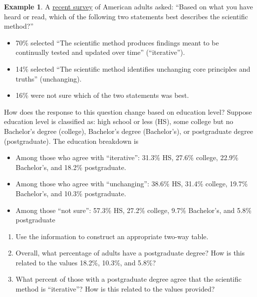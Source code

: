 \documentclass[
]{book}
\providecommand{\tightlist}{%
  \setlength{\itemsep}{0pt}\setlength{\parskip}{0pt}}
\theoremstyle{definition}
\theoremstyle{definition}
\newtheorem{example}{Example}[chapter]
\theoremstyle{definition}
\theoremstyle{remark}
\begin{document}
\begin{example}
\protect\hypertarget{exm:bayes-rule1}{}{\label{exm:bayes-rule1} }
A \href{https://www.pewresearch.org/science/2019/03/28/what-americans-know-about-science/}{recent survey} of American adults asked:
``Based on what you have heard or read, which of the following two statements best describes
the scientific method?''

\begin{itemize}
\tightlist
\item
  70\% selected ``The scientific method produces findings meant to be continually tested
  and updated over time'' (``iterative'').
\item
  14\% selected ``The scientific method identifies unchanging core principles and truths'' (unchanging).
\item
  16\% were not sure which of the two statements was best.
\end{itemize}

How does the response to this question change based on education level? Suppose education level is classified as: high school or less (HS), some college but no Bachelor's degree (college), Bachelor's degree (Bachelor's), or postgraduate degree (postgraduate). The education breakdown is

\begin{itemize}
\tightlist
\item
  Among those who agree with ``iterative'': 31.3\% HS, 27.6\% college, 22.9\% Bachelor's, and 18.2\% postgraduate.
\item
  Among those who agree with ``unchanging'': 38.6\% HS, 31.4\% college, 19.7\% Bachelor's, and 10.3\% postgraduate.
\item
  Among those ``not sure'': 57.3\% HS, 27.2\% college, 9.7\% Bachelor's, and 5.8\% postgraduate
\end{itemize}
\end{example}

\begin{enumerate}
\def\labelenumi{\arabic{enumi}.}
\tightlist
\item
  Use the information to construct an appropriate two-way table.
\item
  Overall, what percentage of adults have a postgraduate degree? How is this related to the values 18.2\%, 10.3\%, and 5.8\%?
\item
  What percent of those with a postgraduate degree agree that the scientific method is ``iterative''? How is this related to the values provided?
\end{enumerate}
\end{document}
